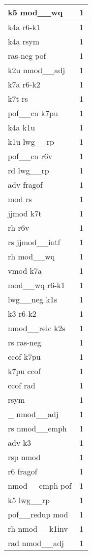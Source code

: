 \documentclass[a4 paper]{article}
\begin{document}
\begin{longtable}{p{}p{}}
k5 mod\_\_wq  & 1 \\ \midrule
k4a r6-k1  & 1 \\ \midrule
k4a rsym  & 1 \\ \midrule
ras-neg pof  & 1 \\ \midrule
k2u nmod\_\_adj  & 1 \\ \midrule
k7a r6-k2  & 1 \\ \midrule
k7t rs  & 1 \\ \midrule
pof\_\_cn k7pu  & 1 \\ \midrule
k4a k1u  & 1 \\ \midrule
k1u lwg\_\_rp  & 1 \\ \midrule
pof\_\_cn r6v  & 1 \\ \midrule
rd lwg\_\_rp  & 1 \\ \midrule
adv fragof  & 1 \\ \midrule
mod rs  & 1 \\ \midrule
jjmod k7t  & 1 \\ \midrule
rh r6v  & 1 \\ \midrule
rs jjmod\_\_intf  & 1 \\ \midrule
rh mod\_\_wq  & 1 \\ \midrule
vmod k7a  & 1 \\ \midrule
mod\_\_wq r6-k1  & 1 \\ \midrule
lwg\_\_neg k1s  & 1 \\ \midrule
k3 r6-k2  & 1 \\ \midrule
nmod\_\_relc k2s  & 1 \\ \midrule
rs ras-neg  & 1 \\ \midrule
ccof k7pu  & 1 \\ \midrule
k7pu ccof  & 1 \\ \midrule
ccof rad  & 1 \\ \midrule
rsym \_  & 1 \\ \midrule
\_ nmod\_\_adj  & 1 \\ \midrule
rs nmod\_\_emph  & 1 \\ \midrule
adv k3  & 1 \\ \midrule
rsp nmod  & 1 \\ \midrule
r6 fragof  & 1 \\ \midrule
nmod\_\_emph pof  & 1 \\ \midrule
k5 lwg\_\_rp  & 1 \\ \midrule
pof\_\_redup mod  & 1 \\ \midrule
rh nmod\_\_k1inv  & 1 \\ \midrule
rad nmod\_\_adj  & 1 \\ \midrule

\end{longtable}
\end{document}
